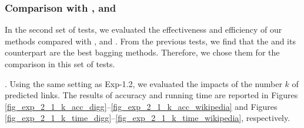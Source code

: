 

\subsubsection{Comparison with \Aa, \RA and \BIGCLAM}
In the second set of tests, we evaluated the effectiveness and efficiency of our
methods compared with \Aa, \RA and \BIGCLAM. From the previous tests, we find that the
\Biasedp and its counterpart \Biased are the best bagging methods. Therefore, we
chose them for the comparison in this set of tests.


. Using the same setting as Exp-1.2, we evaluated
the impacts of the number $k$ of predicted links.
The results of accuracy and running time are reported in Figures \ref{fig_exp_2_1_k_acc_digg}--\ref{fig_exp_2_1_k_acc_wikipedia}
and Figures \ref{fig_exp_2_1_k_time_digg}--\ref{fig_exp_2_1_k_time_wikipedia}, respectively.

